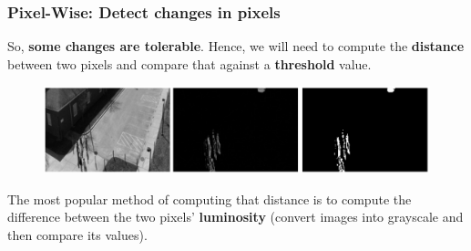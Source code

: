 \documentclass[13.5pt,aspecratio=169, xcolor=dvipsnames]{beamer}
\begin{document}

\begin{frame}
    \onehalfspacing
        \frametitle{Pixel-Wise: Detect changes in pixels}
        
        
        
        So, \textbf{some changes are tolerable}. Hence, we will need to compute the \textbf{distance} between two pixels and compare that against a \textbf{threshold} value.

        \bigskip

        \begin{figure}[h]
            \centering
            \includegraphics[width=\linewidth]{Pixel_wise_threshold.png}
        \end{figure}

        \bigskip

        The most popular method of computing that distance is to compute the difference between the two pixels’ \textbf{luminosity} (convert images into grayscale and then compare its values).

      
\end{frame}
    
\end{document}
